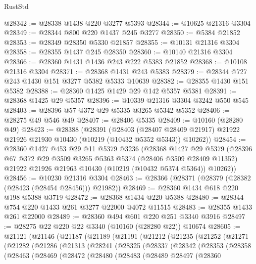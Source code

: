\begin{lexlean}{RustStd}
\begin{coremodule}
@28342 := @28338 @1438 @220 @3277 @5393
@28344 := @10625 @21316 @3304
@28349 := @28344 @800 @220 @1437 @245 @3277
@28350 := @5384 @21852
@28353 := @28349 @28350 @5330 @21857
@28355 := @10131 @21316 @3304
@28358 := @28355 @1437 @245 @28350
@28360 := @10140 @21316 @3304
@28366 := @28360 @1431 @1436 @243 @222 @5383 @21852
@28368 := @10108 @21316 @3304
@28371 := @28368 @1431 @243 @5383
@28379 := @28344 @727 @243 @1430 @151 @3277 @5382 @5333 @10639
@28382 := @28355 @1430 @151 @5382
@28388 := @28360 @1425 @1429 @29 @142 @5357 @5381
@28391 := @28368 @1425 @29 @5357
@28396 := @10339 @21316 @3304 @3242 @550 @545
@28403 := @28396 @57 @372 @29 @5335 @3265 @5342 @5352
@28406 := @28275 @49 @546 @49
@28407 := @28406 @5335
@28409 := @10160 (@28280 @49)
@28423 := @28388
    (@28391
      (@28403
        (@28407 @28409 @21917)
        @21922
        @21926
        @21930
        @10430
        (@10219 (@10432 @5352 @5343))
        @10262))
@28454 := @28360
    @1427
    @453
    @29
    @11
    @5379
    @3236
    (@28368
      @1427
      @29
      @5379
      (@28396
        @67
        @372
        @29
        @3509
        @3265
        @5363
        @5374
        (@28406 @3509 @28409 @11352)
        @21922
        @21926
        @21963
        @10430
        (@10219 (@10432 @5374 @5364))
        @10262))
@28456 := @10230 @21316 @3304
@28463 := @28366 (@28371 (@28379 (@28382 (@28423 (@28454 @28456))) @21982))
@28469 := @28360 @1434 @618 @220 @198 @5388 @3719
@28472 := @28368 @1434 @220 @5388
@28480 := @28344 @754 @220 @1433 @261 @3277 @22000 @4072 @11515
@28483 := @28355 @1433 @261 @22000
@28489 := @28360 @494 @601 @220 @251 @3340 @3916
@28497 := @28275 @22 @220 @22 @3340 (@10160 (@28280 @22)) @10674
@28605 := @21121
    (@21146
      (@21187
        (@21189
          (@21191
            (@21212
              (@21235
                (@21252
                  (@21271
                    (@21282
                      (@21286
                        (@21313
                          (@28241
                            (@28325
                              (@28337
                                (@28342
                                  (@28353
                                    (@28358
                                      (@28463
                                        (@28469
                                          (@28472
                                            (@28480
                                              (@28483
                                                (@28489
                                                  @28497
                                                  (@28360

\end{coremodule}
\end{lexlean}
